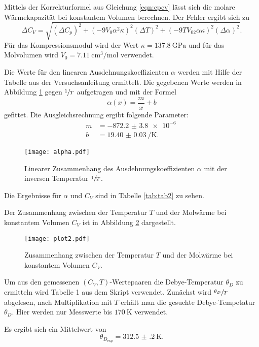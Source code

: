 Mittels der Korrekturformel aus Gleichung \ref{eqn:cpcv}
lässt sich die molare Wärmekapazität bei konstantem Volumen berechnen.
Der Fehler ergibt sich zu
\begin{equation}
  \Delta C_V=\sqrt{(\Delta C_p)^2 +(-9V_0 \alpha^2 \kappa)^2(\Delta T)^2 +(-9TV_02\alpha\kappa)^2(\Delta \alpha)^2}.
\end{equation}
Für das Kompressionsmodul wird der Wert $\kappa=\SI{137.8}{\giga\Pa}$ \cite{kompress}
und für das Molvolumen wird $V_0=\SI{7.11}{\cm^3\per\mol}$
\cite{mol} verwendet.

Die Werte für den linearen Ausdehnungskoeffizienten $\alpha$
werden mit Hilfe der Tabelle aus der Versuchsanleitung \cite{skript} ermittelt.
Die gegebenen Werte werden in Abbildung \ref{fig:alpha} gegen $\sfrac{1}{T}$
aufgetragen und mit der Formel
\begin{equation}
  \alpha(x)= \frac{m}{x}+b
\end{equation}
gefittet. Die Ausgleichsrechnung ergibt folgende Parameter:
\begin{align}
  m &= \SI{-872.2(38)e-6}{}\\
  b &= \SI{19.40(3)}{\per\K}.
\end{align}
\begin{figure}[H]
  \centering
  \texttt{[image: alpha.pdf]}
  \caption{Linearer Zusammenhang des Ausdehnungskoeffizienten $\alpha$ mit der
  inversen Temperatur $\sfrac{1}{T}$.}
  \label{fig:alpha}
\end{figure}

Die Ergebnisse für $\alpha$ und $C_V$ sind in Tabelle \ref{tab:tab2} zu sehen.


Der Zusammenhang zwischen der Temperatur $T$ und der Molwärme bei konstantem Volumen
$C_V$ ist in Abbildung \ref{fig:Cv} dargestellt.

\begin{figure}[H]
  \centering
  \texttt{[image: plot2.pdf]}
  \caption{Zusammenhang zwischen der Temperatur $T$ und der Molwärme bei konstantem Volumen
  $C_V$.}
  \label{fig:Cv}
\end{figure}

Um aus den gemessenen $(C_V, T)$-Wertepaaren die Debye-Temperatur $\theta_D$ zu ermitteln
wird Tabelle 1 aus dem Skript \cite{skript} verwendet. Zunächst wird $\sfrac{\theta_D}{T}$\;
abgelesen, nach Multiplikation mit $T$ erhält man die gesuchte Debye-Tempetatur $\theta_D$.
Hier werden nur Messwerte bis $\SI{170}{\K}$ verwendet.

Es ergibt sich ein Mittelwert von
\begin{equation}
  \theta_{D_\text{exp}}=\SI{312.5(2)}{\K}.
\end{equation}

